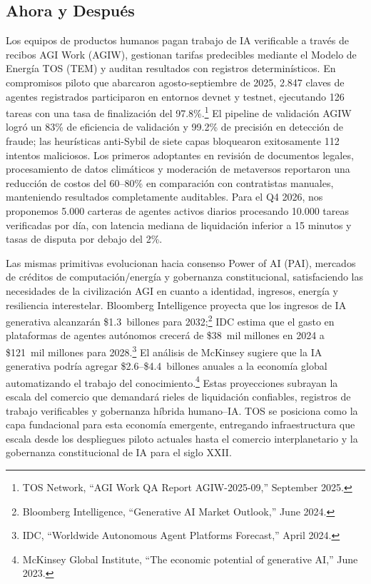 \documentclass[11pt]{article}
\begin{document}
\subsection{Ahora y Después}
\begin{description}[leftmargin=2.1cm, style=nextline]
  \item[12--24 Meses] Los equipos de productos humanos pagan trabajo de IA verificable a través de recibos AGI Work (AGIW), gestionan tarifas predecibles mediante el Modelo de Energía TOS (TEM) y auditan resultados con registros determinísticos. En compromisos piloto que abarcaron agosto-septiembre de 2025, 2.847 claves de agentes registrados participaron en entornos devnet y testnet, ejecutando 126 tareas con una tasa de finalización del 97.8\%.\footnote{TOS Network, ``AGI Work QA Report AGIW-2025-09,'' September 2025.} El pipeline de validación AGIW logró un 83\% de eficiencia de validación y 99.2\% de precisión en detección de fraude; las heurísticas anti-Sybil de siete capas bloquearon exitosamente 112 intentos maliciosos. Los primeros adoptantes en revisión de documentos legales, procesamiento de datos climáticos y moderación de metaversos reportaron una reducción de costos del 60--80\% en comparación con contratistas manuales, manteniendo resultados completamente auditables. Para el Q4 2026, nos proponemos 5.000 carteras de agentes activos diarios procesando 10.000 tareas verificadas por día, con latencia mediana de liquidación inferior a 15 minutos y tasas de disputa por debajo del 2\%.

  \item[Arco de 100 Años] Las mismas primitivas evolucionan hacia consenso Power of AI (PAI), mercados de créditos de computación/energía y gobernanza constitucional, satisfaciendo las necesidades de la civilización AGI en cuanto a identidad, ingresos, energía y resiliencia interestelar. Bloomberg Intelligence proyecta que los ingresos de IA generativa alcanzarán \$1.3~billones para 2032;\footnote{Bloomberg Intelligence, ``Generative AI Market Outlook,'' June 2024.} IDC estima que el gasto en plataformas de agentes autónomos crecerá de \$38~mil millones en 2024 a \$121~mil millones para 2028.\footnote{IDC, ``Worldwide Autonomous Agent Platforms Forecast,'' April 2024.} El análisis de McKinsey sugiere que la IA generativa podría agregar \$2.6--\$4.4~billones anuales a la economía global automatizando el trabajo del conocimiento.\footnote{McKinsey Global Institute, ``The economic potential of generative AI,'' June 2023.} Estas proyecciones subrayan la escala del comercio que demandará rieles de liquidación confiables, registros de trabajo verificables y gobernanza híbrida humano--IA. TOS se posiciona como la capa fundacional para esta economía emergente, entregando infraestructura que escala desde los despliegues piloto actuales hasta el comercio interplanetario y la gobernanza constitucional de IA para el siglo XXII.
\end{description}
\end{document}

